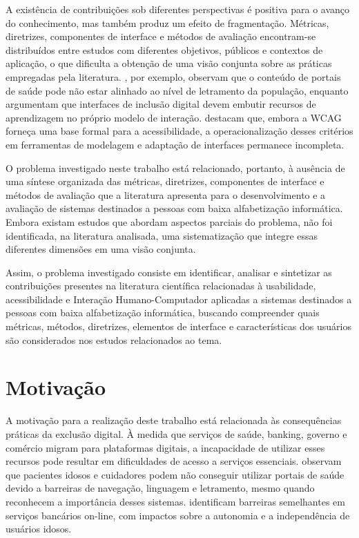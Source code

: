 A existência de contribuições sob diferentes perspectivas é positiva para o avanço do conhecimento, mas também produz um efeito de fragmentação. Métricas, diretrizes, componentes de interface e métodos de avaliação encontram-se distribuídos entre estudos com diferentes objetivos, públicos e contextos de aplicação, o que dificulta a obtenção de uma visão conjunta sobre as práticas empregadas pela literatura. \cite{barron2013feasibility}, por exemplo, observam que o conteúdo de portais de saúde pode não estar alinhado ao nível de letramento da população, enquanto \cite{filgueiras2009recoverability} argumentam que interfaces de inclusão digital devem embutir recursos de aprendizagem no próprio modelo de interação. \cite{wickramathilaka2023addressing} destacam que, embora a WCAG forneça uma base formal para a acessibilidade, a operacionalização desses critérios em ferramentas de modelagem e adaptação de interfaces permanece incompleta.

O problema investigado neste trabalho está relacionado, portanto, à ausência de uma síntese organizada das métricas, diretrizes, componentes de interface e métodos de avaliação que a literatura apresenta para o desenvolvimento e a avaliação de sistemas destinados a pessoas com baixa alfabetização informática. Embora existam estudos que abordam aspectos parciais do problema, não foi identificada, na literatura analisada, uma sistematização que integre essas diferentes dimensões em uma visão conjunta.

Assim, o problema investigado consiste em identificar, analisar e sintetizar as contribuições presentes na literatura científica relacionadas à usabilidade, acessibilidade e Interação Humano-Computador aplicadas a sistemas destinados a pessoas com baixa alfabetização informática, buscando compreender quais métricas, métodos, diretrizes, elementos de interface e características dos usuários são considerados nos estudos relacionados ao tema.

\section{Motivação}

A motivação para a realização deste trabalho está relacionada às consequências práticas da exclusão digital. À medida que serviços de saúde, banking, governo e comércio migram para plataformas digitais, a incapacidade de utilizar esses recursos pode resultar em dificuldades de acesso a serviços essenciais. \cite{barron2013feasibility} observam que pacientes idosos e cuidadores podem não conseguir utilizar portais de saúde devido a barreiras de navegação, linguagem e letramento, mesmo quando reconhecem a importância desses sistemas. \cite{gatsou2017seniors} identificam barreiras semelhantes em serviços bancários on-line, com impactos sobre a autonomia e a independência de usuários idosos.

